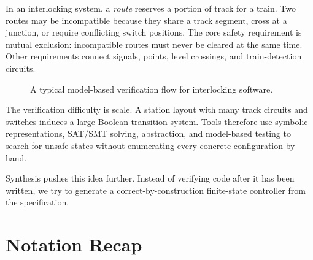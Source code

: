 In an interlocking system, a \emph{route} reserves a portion of track for
a train.  Two routes may be incompatible because they share a track
segment, cross at a junction, or require conflicting switch positions.
The core safety requirement is mutual exclusion: incompatible routes
must never be cleared at the same time.  Other requirements connect
signals, points, level crossings, and train-detection circuits.

\begin{figure}[ht]
\centering
{}
\caption{A typical model-based verification flow for interlocking software.}
\label{fig:railway-verification-flow}
\end{figure}

The verification difficulty is scale.  A station layout with many track
circuits and switches induces a large Boolean transition system.  Tools
therefore use symbolic representations, SAT/SMT solving, abstraction,
and model-based testing to search for unsafe states without enumerating
every concrete configuration by hand.

Synthesis pushes this idea further.  Instead of verifying code after it
has been written, we try to generate a correct-by-construction
finite-state controller from the specification.

\section*{Notation Recap}


